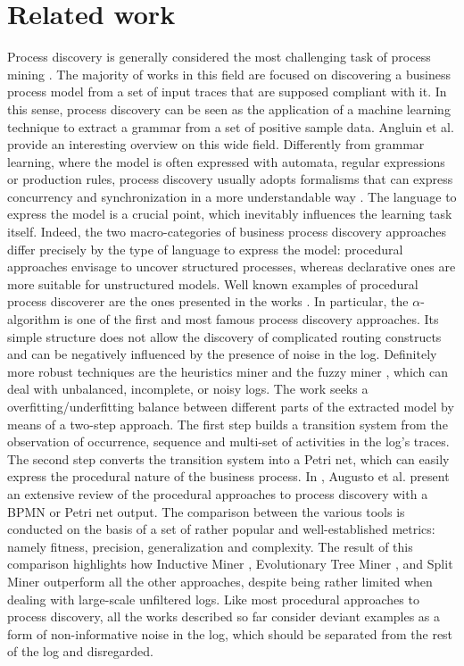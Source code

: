 
\section{Related work}
\label{sec:related}

Process discovery is generally considered the most challenging task of process mining \cite{2012-Maggi}. The majority of works in this field are focused on discovering a business process model from a set of input traces that are supposed compliant with it. In this sense, process discovery can be seen as the application of a machine learning technique to extract a grammar from a set of positive sample data. Angluin et al. \cite{1983-Angliun} provide an interesting overview on this wide field.
Differently from grammar learning, where the model is often expressed with automata, regular expressions or production rules, process discovery usually adopts formalisms that can express concurrency and synchronization in a more understandable way \cite{2009-Goedertier}. 
The language to express the model is a crucial point, which inevitably influences the learning task itself. Indeed, the two macro-categories of business process discovery approaches differ precisely by the type of language to express the model: procedural approaches envisage to uncover structured processes, whereas declarative ones are more suitable for unstructured models.
Well known examples of procedural process discoverer are the ones presented in the works \cite{2004-Aalst,2007-Gunther,2010-Aalst,2013-Leemans,2015-Guo,2017-Augusto}. In particular, the $\alpha$-algorithm \cite{2004-Aalst} is one of the first and most famous process discovery approaches. Its simple structure does not allow the discovery of complicated routing constructs and can be negatively influenced by the presence of noise in the log. Definitely more robust techniques are the heuristics miner \cite{2003-Weijters} and the fuzzy miner \cite{2007-Gunther}, which can deal with unbalanced, incomplete, or noisy logs. The work \cite{2010-Aalst} seeks a overfitting/underfitting balance between different parts of the extracted model by means of a two-step approach. The first step builds a transition system from the observation of occurrence, sequence and multi-set of activities in the log's traces. The second step converts the transition system into a Petri net, which can easily express the procedural nature of the business process.
In \cite{2019-Augusto}, Augusto et al. present an extensive review of the procedural approaches to process discovery with a BPMN or Petri net output. The comparison between the various tools is conducted on the basis of a set of rather popular and well-established metrics: namely fitness, precision, generalization and complexity. The result of this comparison highlights how Inductive Miner \cite{2015-Guo}, Evolutionary Tree Miner \cite{2013-Leemans}, and Split Miner \cite{2017-Augusto} outperform all the other approaches, despite being rather limited when dealing with large-scale unfiltered logs.
Like most procedural approaches to process discovery, all the works described so far consider deviant examples as a form of non-informative noise in the log, which should be separated from the rest of the log and disregarded.
 
